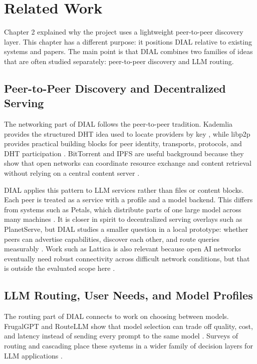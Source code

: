 \section{Related Work}

Chapter 2 explained why the project uses a lightweight peer-to-peer discovery
layer. This chapter has a different purpose: it positions DIAL relative to
existing systems and papers. The main point is that DIAL combines two families
of ideas that are often studied separately: peer-to-peer discovery and LLM
routing.

\subsection{Peer-to-Peer Discovery and Decentralized Serving}

The networking part of DIAL follows the peer-to-peer tradition. Kademlia
provides the structured DHT idea used to locate providers by key
\citep{maymounkov2002kademlia}, while libp2p provides practical building
blocks for peer identity, transports, protocols, and DHT participation
\citep{libp2p}. BitTorrent and IPFS are useful background because they show
that open networks can coordinate resource exchange and content retrieval
without relying on a central content server
\citep{cohen2003bittorrent,benet2014ipfs}.

DIAL applies this pattern to LLM services rather than files or content blocks.
Each peer is treated as a service with a profile and a model backend. This
differs from systems such as Petals, which distribute parts of one large model
across many machines \citep{borzunov2023petals}. It is closer in spirit to
decentralized serving overlays such as PlanetServe, but DIAL studies a smaller
question in a local prototype: whether peers can advertise capabilities,
discover each other, and route queries measurably \citep{fang2026planetserve}.
Work such as Lattica is also relevant because open AI networks eventually need robust
connectivity across difficult network conditions, but that is outside the
evaluated scope here \citep{yang2025lattica}.

\subsection{LLM Routing, User Needs, and Model Profiles}

The routing part of DIAL connects to work on choosing between models. FrugalGPT
and RouteLLM show that model selection can trade off quality, cost, and
latency instead of sending every prompt to the same model
\citep{chen2023frugalgpt,ong2025routellm}. Surveys of routing and cascading
place these systems in a wider family of decision layers for LLM applications
\citep{moslem2026dynamicrouting}.

